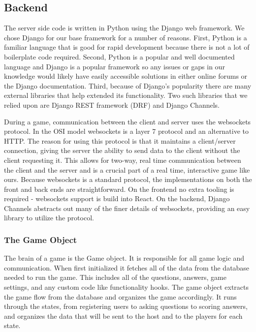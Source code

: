 \documentclass{article}
\begin{document}
	\subsection{Backend}
	    The server side code is written in Python using the Django web framework. We chose Django for our base framework for a number of reasons. First, Python is a familiar language that is good for rapid development because there is not a lot of boilerplate code required. Second, Python is a popular and well documented language and Django is a popular framework so any issues or gaps in our knowledge would likely have easily accessible solutions in either online forums or the Django documentation. Third, because of Django's popularity there are many external libraries that help extended its functionality. Two such libraries that we relied upon are Django REST framework (DRF) and Django Channels.
	    \smallskip

        During a game, communication between the client and server uses the websockets protocol. In the OSI model websockets is a layer 7 protocol and an alternative to HTTP. The reason for using this protocol is that it maintains a client/server connection, giving the server the ability to send data to the client without the client requesting it. This allows for two-way, real time communication between the client and the server and is a crucial part of a real time, interactive game like ours. Because websockets is a standard protocol, the implementations on both the front and back ends are straightforward. On the frontend no extra tooling is required - websockets support is build into React. On the backend, Django Channels abstracts out many of the finer details of websockets, providing an easy library to utilize the protocol.
        
        \subsubsection{The Game Object}\label{game-object}
            The brain of a game is the Game object. It is responsible for all game logic and communication. When first initialized it fetches all of the data from the database needed to run the game. This includes all of the questions, answers, game settings, and any custom code like functionality hooks. The game object extracts the game flow from the database and organizes the game accordingly. It runs through the states, from registering users to asking questions to scoring answers, and organizes the data that will be sent to the host and to the players for each state.
            \smallskip
            
\end{document}
